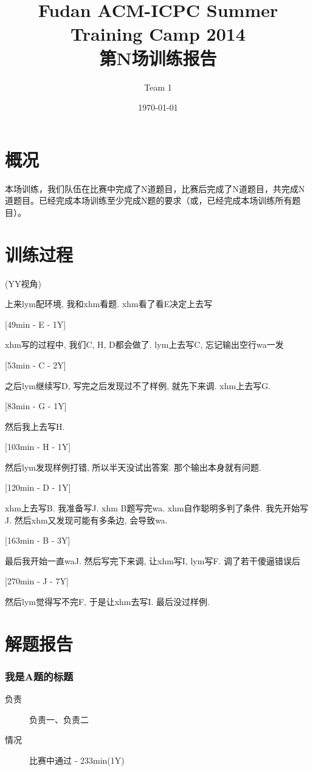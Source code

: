 \documentclass[a4paper, 11pt, nofonts, nocap, fancyhdr]{ctexart}
\title{Fudan ACM-ICPC Summer Training Camp 2014\\第N场训练报告}
\author{Team 1}
\date{\today}
\newcommand{\problem}[1]{\subsubsection{#1}}
\begin{document}
\maketitle

\section{概况}

本场训练，我们队伍在比赛中完成了N道题目，比赛后完成了N道题目，共完成N道题目。已经完成本场训练至少完成N题的要求（或，已经完成本场训练所有题目）。

\section{训练过程}

(YY视角)

上来lym配环境, 我和xhm看题.	xhm看了看E决定上去写

[49min - E - 1Y]

xhm写的过程中, 我们C, H, D都会做了. lym上去写C, 忘记输出空行wa一发

[53min - C - 2Y]

之后lym继续写D, 写完之后发现过不了样例, 就先下来调. xhm上去写G. 

[83min - G - 1Y]

然后我上去写H.

[103min - H - 1Y]

然后lym发现样例打错, 所以半天没试出答案. 那个输出本身就有问题.

[120min - D - 1Y]

xhm上去写B. 我准备写J. xhm B题写完wa. xhm自作聪明多判了条件. 我先开始写J. 然后xhm又发现可能有多条边, 会导致wa.

[163min - B - 3Y]

最后我开始一直waJ. 然后写完下来调, 让xhm写I, lym写F. 调了若干傻逼错误后

[270min - J - 7Y]

然后lym觉得写不完F, 于是让xhm去写I. 最后没过样例.

\section{解题报告}

\problem{我是A题的标题}

\begin{description}
\item[负责] 负责一、负责二
\item[情况] 比赛中通过 - 233min(1Y)
\end{description}
\end{document}
